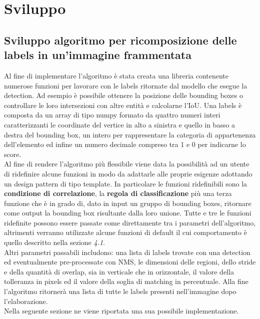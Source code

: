 \section{Sviluppo}
\subsection{Sviluppo algoritmo per ricomposizione delle labels in un'immagine frammentata}
Al fine di implementare l'algoritmo è stata creata una libreria contenente numerose funzioni per lavorare con le labels ritornate dal modello che esegue la detection. Ad esempio è possibile ottenere la posizione delle bounding boxes o controllare le loro intersezioni con altre entità e calcolarne l'IoU. Una labels è composta da un array di tipo numpy formato da quattro numeri interi caratterizzanti le coordinate del vertice in alto a sinistra e quello in basso a destra del bounding box, un intero per rappresentare la categoria di appartenenza dell'elemento ed infine un numero decimale compreso tra 1 e 0 per indicarne lo score.\\
Al fine di rendere l'algoritmo più flessibile viene data la possibilità ad un utente di ridefinire alcune funzioni in modo da adattarle alle proprie esigenze adottando un design pattern di tipo template. In particolare le funzioni ridefinibili sono la \textbf{condizione di correlazione}, la \textbf{regola di classificazione} più una terza funzione che è in grado di, dato in input un gruppo di bounding boxes, ritornare come output la bounding box risultante dalla loro unione. Tutte e tre le funzioni ridefinite possono essere passate come direttamente tra i parametri dell'algoritmo, altrimenti verranno utilizzate alcune funzioni di default il cui comportamento è quello descritto nella sezione \textit{4.1}.\\
Altri parametri passabili includono: una lista di labels trovate con una detection ed eventualmente pre-processate con NMS, le dimensioni delle regioni, dello stride e della quantità di overlap, sia in verticale che in orizzontale, il valore della tolleranza in pixels ed il valore della soglia di matching in percentuale.
Alla fine l'algoritmo ritornerà una lista di tutte le labels presenti nell'immagine dopo l'elaborazione.\\ Nella seguente sezione ne viene riportata una sua possibile implementazione.
